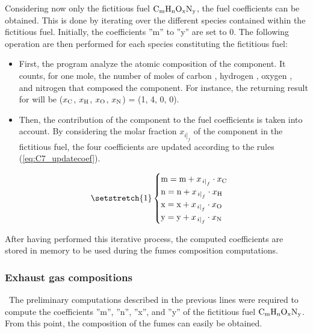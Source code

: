 Considering now only the fictitious fuel $\ce{C_{\text{m}}H_{\text{n}}O_{\text{x}}N_{\text{y}}}$, the fuel coefficients can be obtained. This is done by iterating over the different species contained within the fictitious fuel. Initially, the coefficients ''m'' to ''y'' are set to 0. The following operation are then performed for each species constituting the fictitious fuel:
\begin{itemize}
    \item First, the program analyze the atomic composition of the component. It counts, for one mole, the number of moles of carbon , hydrogen , oxygen , and nitrogen  that composed the component. For instance, the returning result for  will be ($x_{\ce{C}}$, $x_{\ce{H}}$, $x_{\ce{O}}$, $x_{\ce{N}}$) = (1, 4, 0, 0).
    \item Then, the contribution of the component to the fuel coefficients is taken into account. By considering the molar fraction $x_{\left.i\right|_f}$ of the component in the fictitious fuel, the four coefficients are updated according to the rules (\ref{eq:C7_updatecoef}).
    
    \begin{equation}
    \setstretch{1}
        \begin{cases}
        \text{m}=\text{m}+x_{\left.i\right|_f}\cdot x_{\ce{C}}\\
        \text{n}=\text{n}+x_{\left.i\right|_f}\cdot x_{\ce{H}}\\
        \text{x}=\text{x}+x_{\left.i\right|_f}\cdot x_{\ce{O}}\\
        \text{y}=\text{y}+x_{\left.i\right|_f}\cdot x_{\ce{N}}
        \end{cases}\label{eq:C7_updatecoef}
    \end{equation}
\end{itemize}

After having performed this iterative process, the computed coefficients are stored in memory to be used during the fumes composition computations.
\subsubsection{Exhaust gas compositions}
\quad\ The preliminary computations described in the previous lines were required to compute the coefficients ''m'', ''n'', ''x'', and ''y'' of the fictitious fuel $\ce{C_{\text{m}}H_{\text{n}}O_{\text{x}}N_{\text{y}}}$. From this point, the composition of the fumes can easily be obtained. 

